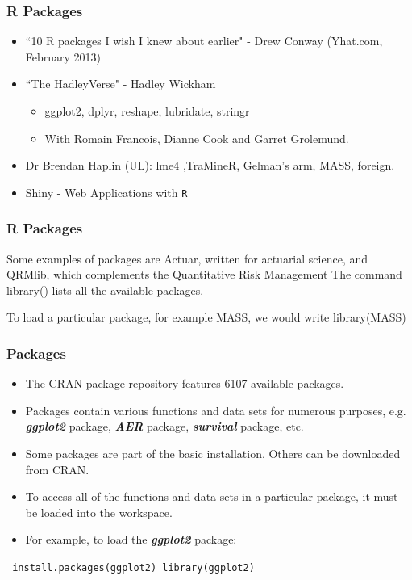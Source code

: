 \documentclass{beamer}
\begin{document}
 	
 	\begin{frame} 
 		\frametitle{R Packages}
 		
 		\begin{itemize}
 			\item ``10 R packages I wish I knew about earlier" - Drew Conway (Yhat.com, February 2013)
 			\bigskip \item ``The HadleyVerse" - Hadley Wickham
 			\begin{itemize}
 				
 				\item  ggplot2, dplyr, reshape, lubridate, stringr
 				
 				\item  With Romain Francois, Dianne Cook and Garret Grolemund.
 			\end{itemize}
 			\bigskip
 			\item Dr Brendan Haplin (UL): lme4 ,TraMineR, Gelman's arm, MASS, foreign. 
 			\bigskip
 			\item Shiny - Web Applications with \texttt{R}
 		\end{itemize}
 	\end{frame}
 	\begin{frame} 
 		\frametitle{R Packages}
 		
 		
 		
 		
 		Some examples of packages are Actuar, written for actuarial science, and
 		QRMlib, which complements the Quantitative Risk Management The command library()
 		lists all the available packages. 
 		
 		To load a particular package, for example MASS, we would
 		write
 		library(MASS)
 		
 	\end{frame}
 	\begin{frame}
 		
 		\frametitle{Packages}
 		\begin{itemize}
 			\item The CRAN package repository features 6107 available packages. 
 			\item Packages contain
 			various functions and data sets for numerous purposes, e.g.
 			\textbf{\textit{ggplot2}} package, \textbf{\textit{AER}} package, \textbf{\textit{survival}} package, etc.
 			\item Some packages are part of the basic installation. Others can be
 			downloaded from CRAN.
 			\item To access all of the functions and data sets in a particular package,
 			it must be loaded into the workspace. 
 			\item For example, to load the
 			\textbf{\textit{ggplot2}} package:
 		\end{itemize}
 		
 		\texttt{		install.packages(ggplot2)
 			library(ggplot2)}
 		
 	\end{frame}
\end{document}
